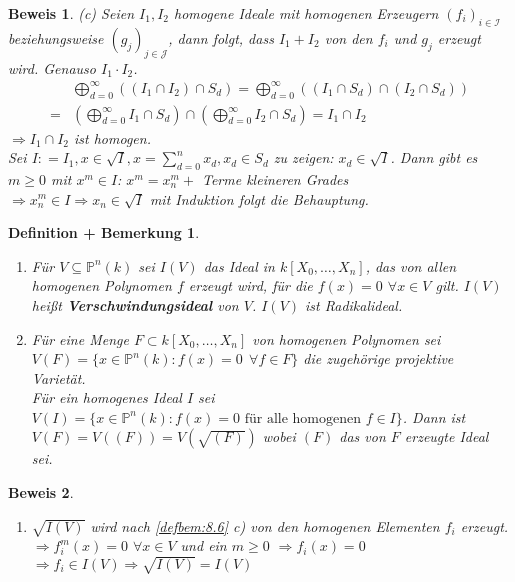 \documentclass[a4paper,12pt]{report}
\theoremstyle{break}
\newtheorem{DefBem}[Def]{Definition + Bemerkung}
\theoremstyle{nonumberbreak}
\theoremstyle{nonumberplain}
\newtheorem{Bew}{Beweis}
\newcommand{\emp}[1]{\textbf{\emph{#1}}}
\newcommand{\begriff}[1]{{\index{#1}}\emp{#1}}
\newcommand{\defeqr}[0]{\mathrel{\mathop:}=}
\begin{document}
\begin{Bew}
  (c) Seien $I_1,I_2$ homogene Ideale mit homogenen Erzeugern $(f_i)_{i\in \mathcal I}$ beziehungsweise
    $(g_j)_{j\in \mathcal J}$, dann folgt, dass $I_1+I_2$ von den $f_i$ und $g_j$ erzeugt wird. Genauso $I_1\cdot I_2$. \\
    \begin{align*}
      & \bigoplus_{d=0}^\infty((I_1\cap I_2)\cap S_d)=\bigoplus_{d=0}^\infty((I_1\cap S_d)\cap (I_2\cap S_d)) \\
      = & \left(\bigoplus_{d=0}^\infty I_1\cap S_d\right)\cap \left(\bigoplus_{d=0}^\infty I_2\cap S_d\right)=I_1\cap I_2
    \end{align*}
    $\Rightarrow I_1\cap I_2$ ist homogen.\\
    Sei $I\defeqr I_1, x\in\sqrt{I},x=\sum_{d=0}^nx_d,x_d\in S_d$ zu zeigen: $x_d\in\sqrt{I}$.
    Dann gibt es $m\geq 0$ mit $x^m\in I$: $x^m=x_n^m+$ Terme kleineren Grades \\
    $\Rightarrow x_n^m\in I \Rightarrow x_n\in\sqrt{I}$ mit Induktion folgt die Behauptung.
 \end{Bew}
\begin{DefBem}
 \begin{enumerate}
  \item Für $V \subseteq \mathbb P^n(k)$ sei $I(V)$ das Ideal in $k[X_0,\dots,X_n]$, das von allen homogenen Polynomen $f$ erzeugt wird, für die $f(x)=0 $ $\forall x \in V$ gilt. $I(V)$ heißt \begriff{Verschwindungsideal} von $V$. $I(V)$ ist Radikalideal.
  \item Für eine Menge $F \subset k[X_0,\dots,X_n]$ von homogenen Polynomen sei $V(F)=\{ x \in \mathbb P^n(k):f(x)=0~~ \forall f \in F \}$ die zugehörige projektive Varietät. \\ 
  Für ein homogenes Ideal $I$ sei $V(I)=\{ x \in \mathbb P^n(k):f(x)=0  \text{ für alle homogenen } f \in I \} $. Dann ist $V(F)=V((F))=V(\sqrt{(F)})$ wobei $(F)$ das von $F$ erzeugte Ideal sei.
 \end{enumerate}
\end{DefBem}
\begin{Bew}
 \begin{enumerate}
  \item $\sqrt{I(V)}$ wird nach \ref{defbem:8.6} c) von den homogenen Elementen $f_i$ erzeugt.\\
	$\Rightarrow f_i^m(x) = 0$ $\forall x \in V$ und ein $m \ge 0$ $\Rightarrow f_i(x)=0$ $\Rightarrow f_i \in I(V) \Rightarrow \sqrt{I(V)} = I(V)$
 \end{enumerate}
\end{Bew}
\end{document}
